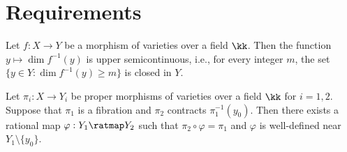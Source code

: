 \section{Requirements}

\begin{proposition}\label{prop:upper semicontinuity of fiber dimension}
    Let \(f: X \to Y\) be a morphism of varieties over a field \(\kk\).
    Then the function \(y \mapsto \dim f^{-1}(y)\) is upper semicontinuous, i.e., for every integer \(m\), the set \(\{y \in Y: \dim f^{-1}(y) \geq m\}\) is closed in \(Y\).
\end{proposition}

\begin{theorem}\label{thm:Rigidity_Lemma}
    Let \(\pi_i: X \to Y_i\) be proper morphisms of varieties over a field \(\kk\) for \(i=1,2\).
    Suppose that \(\pi_1\) is a fibration and \(\pi_2\) contracts \(\pi_1^{-1}(y_0)\).
    Then there exists a rational map \(\varphi: Y_1 \ratmap Y_2\) such that \(\pi_2 \circ \varphi = \pi_1\) and \(\varphi\) is well-defined near \(Y_1 \setminus \{y_0\}\). 
\end{theorem}